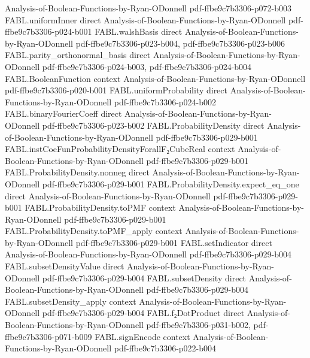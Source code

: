 \begin{theorem}
  {Analysis-of-Boolean-Functions-by-Ryan-ODonnell}
  {pdf-ffbe9c7b3306-p072-b003}
\proofstep
  {FABL.uniformInner}
  {direct}
  {Analysis-of-Boolean-Functions-by-Ryan-ODonnell}
  {pdf-ffbe9c7b3306-p024-b001}
\proofstep
  {FABL.walshBasis}
  {direct}
  {Analysis-of-Boolean-Functions-by-Ryan-ODonnell}
  {pdf-ffbe9c7b3306-p023-b004,
    pdf-ffbe9c7b3306-p023-b006}
\proofstep
  {FABL.parity_orthonormal_basis}
  {direct}
  {Analysis-of-Boolean-Functions-by-Ryan-ODonnell}
  {pdf-ffbe9c7b3306-p024-b003,
    pdf-ffbe9c7b3306-p024-b004}
\proofstep
  {FABL.BooleanFunction}
  {context}
  {Analysis-of-Boolean-Functions-by-Ryan-ODonnell}
  {pdf-ffbe9c7b3306-p020-b001}
\proofstep
  {FABL.uniformProbability}
  {direct}
  {Analysis-of-Boolean-Functions-by-Ryan-ODonnell}
  {pdf-ffbe9c7b3306-p024-b002}
\proofstep
  {FABL.binaryFourierCoeff}
  {direct}
  {Analysis-of-Boolean-Functions-by-Ryan-ODonnell}
  {pdf-ffbe9c7b3306-p023-b002}
\proofstep
  {FABL.ProbabilityDensity}
  {direct}
  {Analysis-of-Boolean-Functions-by-Ryan-ODonnell}
  {pdf-ffbe9c7b3306-p029-b001}
\proofstep
  {FABL.instCoeFunProbabilityDensityForallF₂CubeReal}
  {context}
  {Analysis-of-Boolean-Functions-by-Ryan-ODonnell}
  {pdf-ffbe9c7b3306-p029-b001}
\proofstep
  {FABL.ProbabilityDensity.nonneg}
  {direct}
  {Analysis-of-Boolean-Functions-by-Ryan-ODonnell}
  {pdf-ffbe9c7b3306-p029-b001}
\proofstep
  {FABL.ProbabilityDensity.expect_eq_one}
  {direct}
  {Analysis-of-Boolean-Functions-by-Ryan-ODonnell}
  {pdf-ffbe9c7b3306-p029-b001}
\proofstep
  {FABL.ProbabilityDensity.toPMF}
  {context}
  {Analysis-of-Boolean-Functions-by-Ryan-ODonnell}
  {pdf-ffbe9c7b3306-p029-b001}
\proofstep
  {FABL.ProbabilityDensity.toPMF_apply}
  {context}
  {Analysis-of-Boolean-Functions-by-Ryan-ODonnell}
  {pdf-ffbe9c7b3306-p029-b001}
\proofstep
  {FABL.setIndicator}
  {direct}
  {Analysis-of-Boolean-Functions-by-Ryan-ODonnell}
  {pdf-ffbe9c7b3306-p029-b004}
\proofstep
  {FABL.subsetDensityValue}
  {direct}
  {Analysis-of-Boolean-Functions-by-Ryan-ODonnell}
  {pdf-ffbe9c7b3306-p029-b004}
\proofstep
  {FABL.subsetDensity}
  {direct}
  {Analysis-of-Boolean-Functions-by-Ryan-ODonnell}
  {pdf-ffbe9c7b3306-p029-b004}
\proofstep
  {FABL.subsetDensity_apply}
  {context}
  {Analysis-of-Boolean-Functions-by-Ryan-ODonnell}
  {pdf-ffbe9c7b3306-p029-b004}
\proofstep
  {FABL.f₂DotProduct}
  {direct}
  {Analysis-of-Boolean-Functions-by-Ryan-ODonnell}
  {pdf-ffbe9c7b3306-p031-b002,
    pdf-ffbe9c7b3306-p071-b009}
\proofstep
  {FABL.signEncode}
  {context}
  {Analysis-of-Boolean-Functions-by-Ryan-ODonnell}
  {pdf-ffbe9c7b3306-p022-b004}
\proofstep

\end{theorem}
